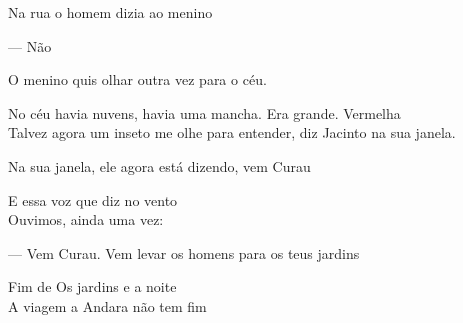 Na rua o homem dizia ao menino

--- Não

O menino quis olhar outra vez para o céu.

No céu havia nuvens, havia uma mancha. Era grande. Vermelha\\

Talvez agora um inseto me olhe para entender, diz Jacinto na sua janela.

Na sua janela, ele agora está dizendo, vem Curau

\breakk

\vspace*{4cm}

E essa voz que diz no vento\\

Ouvimos, ainda uma vez:

--- Vem Curau. Vem levar os homens para os teus jardins


\vfill
Fim de Os jardins e a noite\\

A viagem a Andara não tem fim